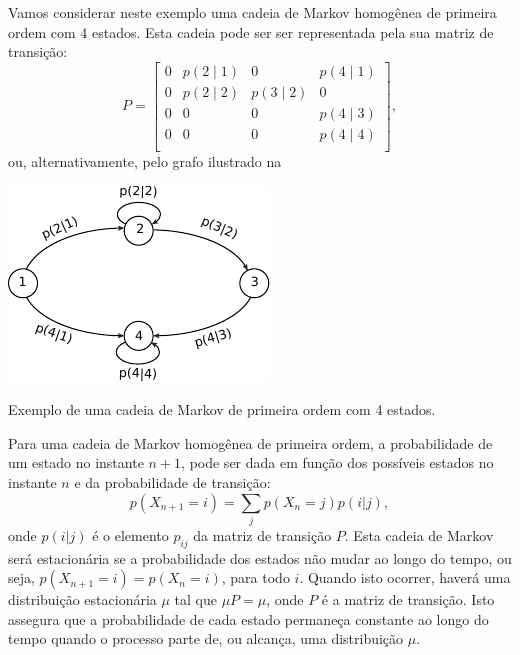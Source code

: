 \begin{example}
  Vamos considerar neste exemplo uma cadeia de Markov homogênea de primeira ordem
  com 4 estados. Esta cadeia pode ser ser representada pela sua matriz de transição:
  \begin{equation}
  P = \begin{bmatrix}
          0 & p(2 \mid 1) & 0 & p(4 \mid 1) \\
          0 & p(2 \mid 2) & p(3 \mid 2) & 0 \\
          0 & 0 & 0 & p(4 \mid 3) \\
          0 & 0 & 0 & p(4 \mid 4) \\
          \end{bmatrix} ,
 \end{equation}
 ou, alternativamente, pelo grafo ilustrado na 

\begin{marginfigure}%
  \includegraphics[width=\linewidth]{figures/markov-example.pdf}
  \caption{Exemplo de uma cadeia de Markov de primeira ordem com 4 estados.}
  \label{fig:markov-example}
\end{marginfigure}
\end{example}

Para uma cadeia de Markov homogênea de primeira ordem,
a probabilidade de um estado no instante $n+1$, pode ser dada em função dos possíveis
estados no instante $n$ e da probabilidade de transição:
\begin{equation}
  p(X_{n+1} = i) = \sum_{j} p(X_n = j) p(i|j) ,
\end{equation}
onde $p(i|j)$ é o elemento $p_{ij}$ da matriz de transição $P$. Esta cadeia de
Markov será estacionária se a probabilidade dos estados não mudar
ao longo do tempo, ou seja, $p(X_{n+1} = i) = p(X_n = i)$, para todo $i$.
Quando isto ocorrer, haverá uma distribuição estacionária $\mu$ tal que $\mu P = \mu$, onde $P$ é a matriz de transição.
Isto assegura que a probabilidade de cada estado permaneça constante ao longo do tempo quando o processo parte de,
ou alcança, uma distribuição $\mu$.

